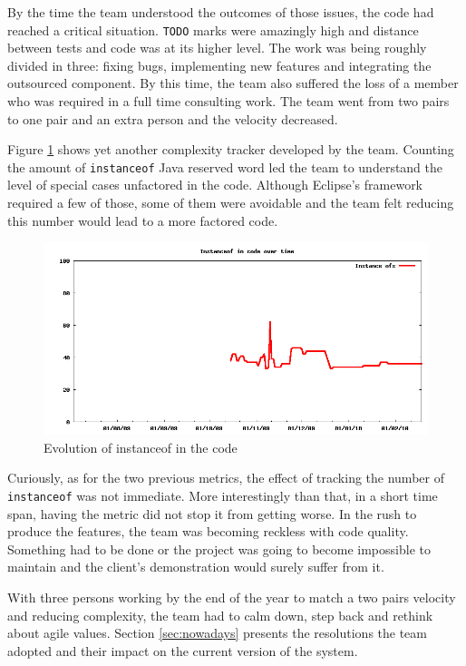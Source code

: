 \documentclass[lnbip]{svmultln}
\begin{document}
By the time the team understood the outcomes of those issues, the code
had reached a critical situation. \texttt{TODO} marks were amazingly
high and distance between tests and code was at its higher level. The
work was being roughly divided in three: fixing bugs, implementing new
features and integrating the outsourced component. By this time, the
team also suffered the loss of a member who was required in a full
time consulting work. The team went from two pairs to one pair and an
extra person and the velocity decreased.

Figure \ref{fig:InstanceOfs} shows yet another complexity tracker
developed by the team. Counting the amount of \texttt{instanceof} Java
reserved word led the team to understand the level of special cases
unfactored in the code. Although Eclipse's framework required a few of
those, some of them were avoidable and the team felt reducing this
number would lead to a more factored code.

\begin{figure}[hbt]
  \centerline{
    \includegraphics[width=120mm]{InstanceOfs.png}
  }
  \caption{Evolution of instanceof in the code }
  \label{fig:InstanceOfs}
\end{figure}

Curiously, as for the two previous metrics, the effect of tracking the
number of \texttt{instanceof} was not immediate. More interestingly
than that, in a short time span, having the metric did not stop it
from getting worse. In the rush to produce the features, the team was
becoming reckless with code quality.  Something had to be done or the
project was going to become impossible to maintain and the client's
demonstration would surely suffer from it.

With three persons working by the end of the year to match a two pairs
velocity and reducing complexity, the team had to calm down, step back
and rethink about agile values. Section \ref{sec:nowadays} presents
the resolutions the team adopted and their impact on the current
version of the system.
\end{document}

